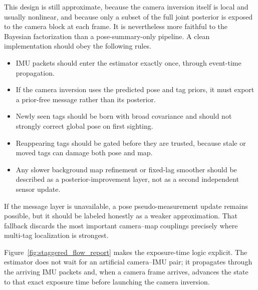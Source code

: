 \documentclass[11pt]{report}
\begin{document}
This design is still approximate, because the camera inversion itself is local and usually nonlinear, and because only a subset of the full joint posterior is exposed to the camera block at each frame. It is nevertheless more faithful to the Bayesian factorization than a pose-summary-only pipeline. A clean implementation should obey the following rules.
\begin{itemize}
    \item IMU packets should enter the estimator exactly once, through event-time propagation.
    \item If the camera inversion uses the predicted pose and tag priors, it must export a prior-free message rather than its posterior.
    \item Newly seen tags should be born with broad covariance and should not strongly correct global pose on first sighting.
    \item Reappearing tags should be gated before they are trusted, because stale or moved tags can damage both pose and map.
    \item Any slower background map refinement or fixed-lag smoother should be described as a posterior-improvement layer, not as a second independent sensor update.
\end{itemize}
If the message layer is unavailable, a pose pseudo-measurement update remains possible, but it should be labeled honestly as a weaker approximation. That fallback discards the most important camera--map couplings precisely where multi-tag localization is strongest.

Figure~\ref{fig:staggered_flow_report} makes the exposure-time logic explicit. The estimator does not wait for an artificial camera--IMU pair; it propagates through the arriving IMU packets and, when a camera frame arrives, advances the state to that exact exposure time before launching the camera inversion.
\end{document}
